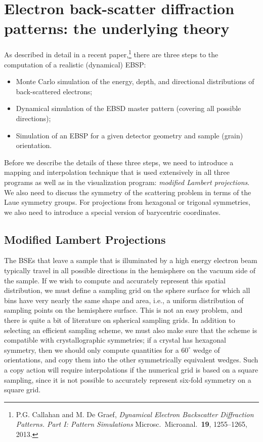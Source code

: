 \documentclass[DIV=calc, paper=letter, fontsize=11pt]{scrartcl}	 %
\begin{document}
\newpage
\section{Electron back-scatter diffraction patterns: the underlying theory\label{sec:theory}}
As described in detail in a recent paper,\footnote{P.G. Callahan and M. De Graef, \textit{Dynamical Electron Backscatter Diffraction Patterns. Part I: Pattern Simulations}
Microsc.\ Microanal.\ \textbf{19}, 1255--1265, 2013.} there are three steps to the computation of a realistic (dynamical) EBSP:
\begin{itemize}
	\item Monte Carlo simulation of the energy, depth, and directional distributions of back-scattered electrons;
	\item Dynamical simulation of the EBSD master pattern (covering all possible directions);
	\item Simulation of an EBSP for a given detector geometry and sample (grain) orientation.
\end{itemize}

Before we describe the details of these three steps, we need to introduce a mapping and interpolation technique that is used extensively in all
three programs as well as in the visualization program: \textit{modified Lambert projections}.  We also need to discuss the 
symmetry of the scattering problem in terms of the Laue symmetry groups. For projections from hexagonal or trigonal symmetries, we 
also need to introduce a special version of barycentric coordinates.

\subsection{Modified Lambert Projections \label{sec:Lambert}}
The BSEs that leave a sample that is illuminated by a high energy electron beam typically travel in all possible directions in the hemisphere
on the vacuum side of the sample.  If we wish to compute and accurately represent this spatial distribution, we must define a sampling grid 
on the sphere surface for which all bins have very nearly the same shape and area, i.e., a uniform distribution of sampling points 
on the hemisphere surface.  This is not an easy problem, and there is quite a bit of literature on spherical sampling grids.  In addition 
to selecting an efficient sampling scheme, we must also make sure that the scheme is compatible with crystallographic symmetries; if a crystal
has hexagonal symmetry, then we should only compute quantities for a $60^{\circ}$ wedge of orientations, and copy them into the other symmetrically
equivalent wedges.  Such a copy action will require interpolations if the numerical grid is based on a square sampling, since it is not possible
to accurately represent six-fold symmetry on a square grid.  
\end{document}
